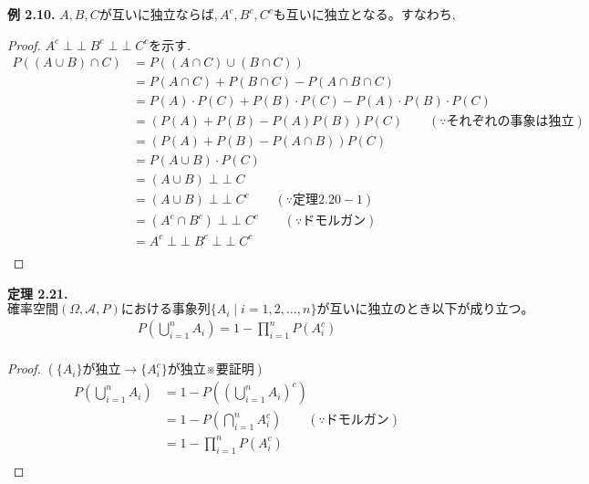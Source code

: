 \documentclass[dvipdfmx,10pt, a4j]{jarticle}
\newcommand{\indepe}{\mathop{\perp\!\!\!\perp}}
\theoremstyle{definition}
\begin{document}
\newpage
\noindent
\textbf{例 2.10.} $A, B, C が互いに独立ならば, A^{c}, B^{c} ,C^{c} も互いに独立となる。すなわち,$\\
\begin{proof}
    $A^{c} \indepe B^{c} \indepe C^{c}$を示す.\\
    \begin{align*}
        P((A \cup B) \cap C) &= P((A \cap C) \cup (B \cap C))\\
        &= P(A \cap C) + P(B \cap C) - P(A \cap B \cap C)\\
        &= P(A) \cdot P(C) + P(B) \cdot P(C) - P(A) \cdot P(B) \cdot P(C)\\
        &= (P(A) + P(B) - P(A)P(B))P(C) \qquad (\because それぞれの事象は独立)\\
        &= (P(A) + P(B) - P(A \cap B))P(C)\\
        &= P(A \cup B) \cdot P(C)\\
        &= (A \cup B) \indepe C \\
        &= (A \cup B) \indepe C^{c} \qquad (\because 定理 2.20-1)\\
        &= (A^{c} \cap B^{c}) \indepe C^{c} \qquad (\because ドモルガン)\\
        &= A^{c} \indepe B^{c} \indepe C^{c}\\
    \end{align*}
\end{proof}

\noindent
\textbf{定理 2.21.} $確率空間 (\Omega, \mathcal{A}, P)における事象列 \{ A_i \mid i = 1, 2, \dots ,n \}が互いに独立のとき以下が成り立つ。$\\
\begin{align*}
    P(\bigcup_{i=1}^{n}{A_i}) = 1 - \prod_{i = 1}^{n}{P(A_i^{c})}\\
\end{align*}
\begin{proof}
    $(\{A_i\}が独立　\rightarrow \{A^{c}_i\}が独立 ※要証明)$\\
    \begin{align*}
        P(\bigcup_{i=1}^{n}{A_i}) &= 1 - P((\bigcup_{i=1}^{n}{A_i})^{c})\\
        &= 1 - P(\bigcap_{i=1}^{n}{A^{c}_i}) \qquad (\because ドモルガン)\\
        &= 1 - \prod_{i=1}^{n}{P(A^{c}_i)}\\
    \end{align*}
\end{proof}
\end{document}
